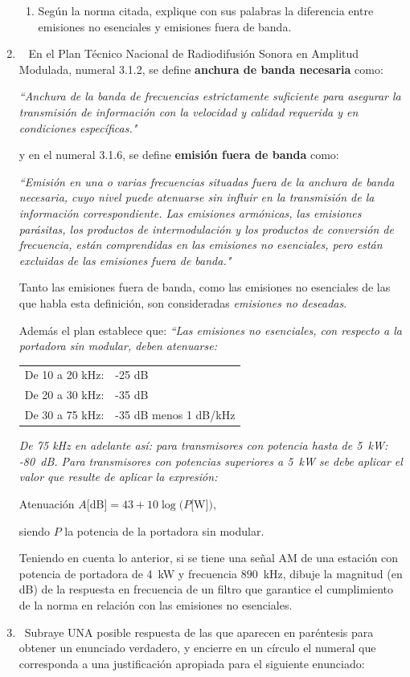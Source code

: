 \begin{enumerate}
\begin{enumerate}
\item Según la norma citada, explique con sus palabras la diferencia entre emisiones no esenciales y emisiones fuera de banda.
	\end{enumerate}
\item~ En el Plan Técnico Nacional de Radiodifusión Sonora en Amplitud Modulada, numeral 3.1.2, se define \textbf{anchura de banda necesaria} como:

\textit{``Anchura de la banda de frecuencias estrictamente suficiente para asegurar la transmisión de información con la velocidad y calidad requerida y en condiciones específicas."}

y en el numeral 3.1.6, se define \textbf{emisión fuera de banda }como: 

\textit{``Emisión en una o varias frecuencias situadas fuera de la anchura de banda necesaria, cuyo nivel puede atenuarse sin influir en la transmisión de la información correspondiente. Las emisiones armónicas, las emisiones parásitas, los productos de intermodulación y los productos de conversión de frecuencia, están comprendidas en las emisiones no esenciales, pero están excluidas de las emisiones fuera de banda."}

Tanto las emisiones fuera de banda, como las emisiones no esenciales de las que habla esta definición, son consideradas \textit{emisiones no deseadas}.

Además el plan establece que: 
\textit{``Las emisiones no esenciales, con respecto a la portadora sin modular, deben atenuarse:}

\begin{center}
	\begin{tabular}{ll}
		De 10 a 20 kHz: & -25 dB \\ 
		De 20 a 30 kHz: & -35 dB \\
		De 30 a 75 kHz: & -35 dB menos 1 dB/kHz
	\end{tabular}
\end{center}

\textit{De 75 kHz en adelante así: para transmisores con potencia hasta de 5~kW: -80~dB. Para transmisores con potencias superiores a 5~kW se debe aplicar el valor que resulte de aplicar la expresión:}
\begin{center}
	Atenuación $A[$dB$] = 43 + 10 \log (P[$W$])$,
\end{center}
siendo $P$ la potencia de la portadora sin modular.

Teniendo en cuenta lo anterior, si se tiene una señal AM de una estación con potencia de portadora de 4~kW y frecuencia $890$~kHz, dibuje la magnitud (en dB) de la respuesta en frecuencia de un filtro que garantice el cumplimiento de la norma en relación con las emisiones no esenciales.
\item~Subraye UNA posible respuesta de las que aparecen en paréntesis para obtener un enunciado verdadero, y encierre en un círculo el numeral que corresponda a una justificación apropiada para el siguiente enunciado:


\end{enumerate}
